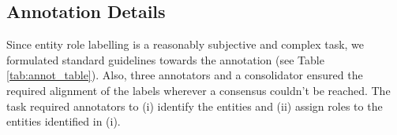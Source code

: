 \documentclass[11pt]{article}
\newcommand{\dataset}{\textcolor{black}{\texttt{HVVMemes}}}
\begin{document}
 
\begin{table}[t!]
\centering
\caption{Statistics of our proposed \dataset\ dataset.}
\label{tab:dataset_summary}
\end{table}
\fi







\subsection{Annotation Details} Since entity role labelling is a reasonably subjective and complex task, we formulated standard guidelines towards the annotation (see Table \ref{tab:annot_table}). Also, three annotators and a consolidator ensured the required alignment of the labels wherever a consensus couldn't be reached. The task required annotators to (i) identify the entities and (ii) assign roles to the entities identified in (i). 
\end{document}
